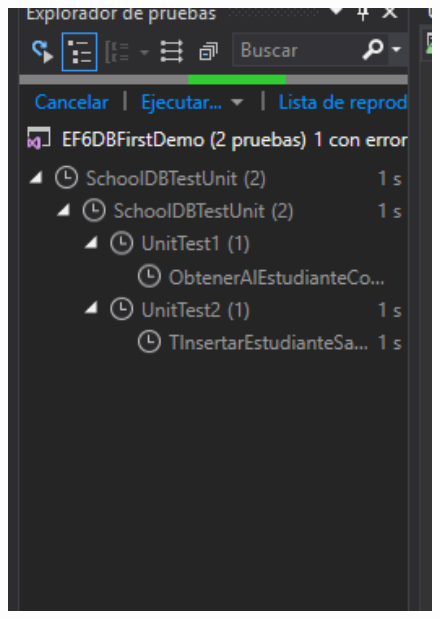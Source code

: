 \begin{itemize}
\begin{figure}[htb]
\begin{center}
\includegraphics[width=12cm]{./Imagenes/1-12}
\end{center}
\end{figure}
\end{itemize}
